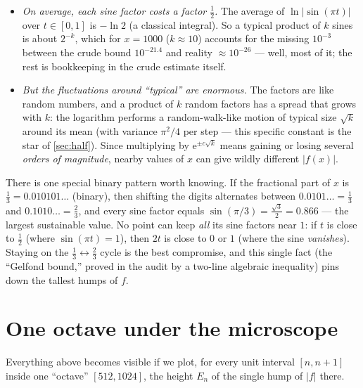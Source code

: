 \documentclass[11pt,oneside]{article}
\theoremstyle{remark}
\newcommand{\e}{\mathrm e}
\begin{document}
\begin{itemize}
\item \emph{On average, each sine factor costs a factor
$\tfrac12$.}  The average of $\ln|\sin(\pi t)|$ over $t\in[0,1]$ is
$-\ln2$ (a classical integral).  So a typical product of $k$ sines is
about $2^{-k}$, which for $x=1000$ ($k\approx10$) accounts for
the missing $10^{-3}$ between the crude bound $10^{-21.4}$ and reality
$\approx10^{-26}$ --- well, most of it; the rest is bookkeeping in the
crude estimate itself.
\item \emph{But the fluctuations around ``typical'' are enormous.}
The factors are like random numbers, and a product of $k$ random
factors has a spread that grows with $k$: the logarithm performs a
random-walk-like motion of typical size $\sqrt{k}$ around its mean
(with variance $\pi^2/4$ per step --- this specific constant is the
star of \cref{sec:half}).  Since multiplying by $\e^{\pm c\sqrt{k}}$
means gaining or losing several \emph{orders of magnitude}, nearby
values of $x$ can give wildly different $|f(x)|$.
\end{itemize}

There is one special binary pattern worth knowing.  If the fractional
part of $x$ is $\tfrac13=0.010101\ldots$ (binary), then shifting the
digits alternates between $0.0101\ldots=\tfrac13$ and
$0.1010\ldots=\tfrac23$, and every sine factor equals
$\sin(\pi/3)=\tfrac{\sqrt3}{2}=0.866$ --- the largest sustainable
value.  No point can keep \emph{all} its sine factors near $1$:
if $t$ is close to $\tfrac12$ (where $\sin(\pi t)=1$), then $2t$ is
close to $0$ or $1$ (where the sine \emph{vanishes}).  Staying on the
$\tfrac13\leftrightarrow\tfrac23$ cycle is the best compromise, and
this single fact (the ``Gelfond bound,'' proved in the audit by a
two-line algebraic inequality) pins down the tallest humps of $f$.

\section{One octave under the microscope}

Everything above becomes visible if we plot, for every unit interval
$[n,n+1]$ inside one ``octave'' $[512,1024]$, the height $E_n$ of the
single hump of $|f|$ there.
\end{document}
